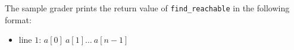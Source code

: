 The sample grader prints the return value of \texttt{find\_reachable} in the following format:
\begin{itemize}
\item line $1$: $a[0]\ a[1]\ldots \ a[n-1]$
\end{itemize}
